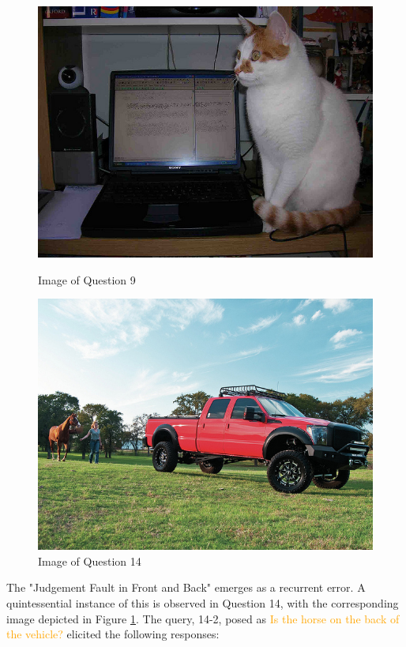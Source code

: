 \documentclass[twocolumn,11pt]{report}
\begin{document}
\begin{figure}[h]
    \centering
    \begin{minipage}{0.5\linewidth}
      \centering
      \includegraphics[width=0.8\linewidth]{../image set/easy/000000047848.jpg}
      \caption{Image of Question 9}
      \label{fig:left-right}
    \end{minipage}%
    \begin{minipage}{0.5\linewidth}
      \centering
      \includegraphics[width=0.8\linewidth]{../image set/easy/000000067428.jpg}
      \caption{Image of Question 14}
      \label{fig:front-back}
    \end{minipage}
\end{figure}

The "Judgement Fault in Front and Back" emerges as a recurrent error. A quintessential instance of this is observed in Question 14, with the corresponding image depicted in Figure \ref{fig:front-back}. The query, 14-2, posed as \textcolor{orange}{Is the horse on the back of the vehicle?} elicited the following responses:
\end{document}
